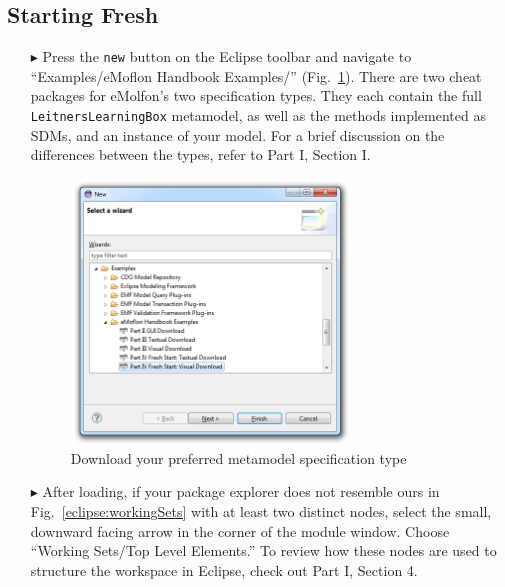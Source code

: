 \subsection{Starting Fresh}
\label{sec:loadSourceMeta}
\begin{itemize}

\item[$\blacktriangleright$] Press the \texttt{new} button on the Eclipse toolbar and navigate to ``Examples/eMoflon Handbook Examples/''
(Fig.~\ref{eclipse:downPartIV}). There are two cheat packages for eMolfon's two specification types. They each contain the full \texttt{LeitnersLearningBox}
metamodel, as well as the methods implemented as SDMs, and an instance of your model. For a brief discussion on the differences between the types, refer to Part
I, Section I.

\begin{figure}[htbp]
\begin{center}
  \includegraphics[width=0.7\textwidth]{eclipse_part4FreshWizardDownload}
  \caption{Download your preferred metamodel specification type}
  \label{eclipse:downPartIV}
\end{center}
\end{figure}

\item[$\blacktriangleright$] After loading, if your package explorer does not resemble ours in Fig.~\ref{eclipse:workingSets} with at least two
distinct nodes, select the small, downward facing arrow in the corner of the module window. Choose ``Working Sets/Top Level Elements.'' To review how these
nodes are used to structure the workspace in Eclipse, check out Part I, Section 4.

\vspace{0.5cm}


\end{itemize}
